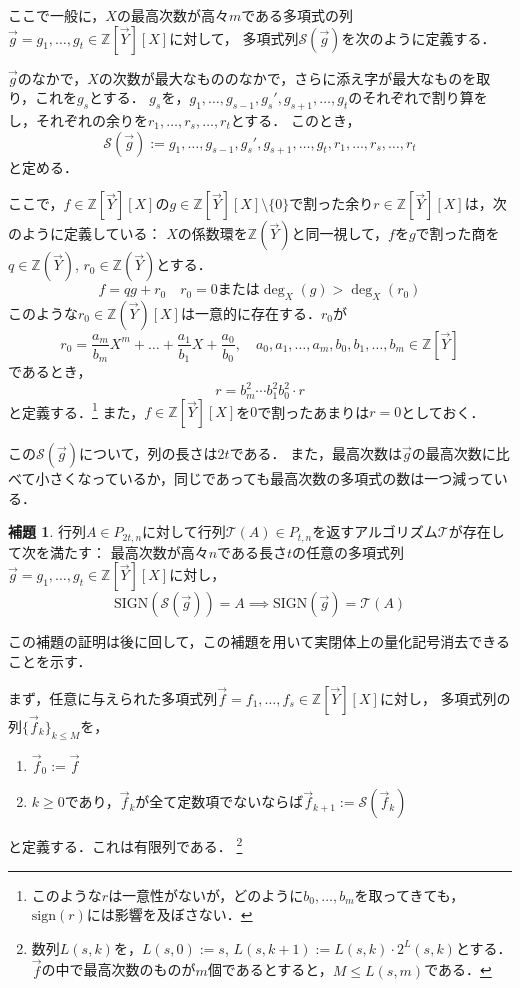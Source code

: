 \documentclass[uplatex, dvipdfmx]{jsarticle}
\newcommand{\sign}{\mathrm{sign}}
\newcommand{\SIGN}{\mathrm{SIGN}}
\newcommand{\Z}{\mathbb{Z}}
\theoremstyle{definition}
\newtheorem{lemma}{補題}[section]
\begin{document}
ここで一般に，$X$の最高次数が高々$m$である多項式の列
$\vec{g} = g_1, \dots, g_t \in \Z[\vec{Y}][X]$に対して，
多項式列$\mathcal{S}(\vec{g})$を次のように定義する．

$\vec{g}$のなかで，$X$の次数が最大なもののなかで，さらに添え字が最大なものを取り，これを$g_s$とする．
$g_s$を，$g_1, \dots, g_{s-1}, g_s', g_{s+1}, \dots, g_t$のそれぞれで割り算をし，それぞれの余りを$r_1, \dots, r_s, \dots, r_t$とする．
このとき，
\[
    \mathcal{S}(\vec{g}):= g_1, \dots, g_{s-1},g_s',g_{s+1},\dots, g_t, r_1, \dots, r_s, \dots, r_t
\]
と定める．


ここで，$f \in \Z[\vec{Y}][X]$の$g \in \Z[\vec{Y}][X] \setminus \{0\}$で割った余り$r \in \Z[\vec{Y}][X]$は，次のように定義している：
$X$の係数環を$\Z(\vec{Y})$と同一視して，$f$を$g$で割った商を$q \in \Z(\vec{Y})$, $r_0 \in \Z(\vec{Y})$とする．
\[ 
    f = q g + r_0 \quad \text{$r_0=0$または$\deg_X(g)>\deg_X(r_0)$}
\]
このような$r_0 \in \Z(\vec{Y})[X]$は一意的に存在する．$r_0$が
\[
    r_0 = \frac{a_m}{b_m} X^m + \dots +\frac{a_1}{b_1}X+ \frac{a_0}{b_0}, \quad a_0,a_1,\dots, a_m,b_0,b_1,\dots, b_m \in \Z[\vec{Y}]
\]
であるとき，
\[
    r = b_m^2 \cdots  b_1^2 b_0^2 \cdot r
\]
と定義する．\footnote{このような$r$は一意性がないが，どのように$b_0,\dots, b_m$を取ってきても，$\sign(r)$には影響を及ぼさない．}
また，$f \in \Z[\vec{Y}][X]$を$0$で割ったあまりは$r=0$としておく．


この$\mathcal{S}(\vec{g})$について，列の長さは$2t$である．
また，最高次数は$\vec{g}$の最高次数に比べて小さくなっているか，同じであっても最高次数の多項式の数は一つ減っている．

\begin{lemma} \label{main}
    行列$A \in P_{2t,n}$に対して行列$\mathcal{T}(A) \in P_{t,n}$を返すアルゴリズム$\mathcal{T}$が存在して次を満たす：
    最高次数が高々$n$である長さ$t$の任意の多項式列$\vec{g}=g_1, \dots, g_t \in \Z[\vec{Y}][X]$に対し，
    \[
        \SIGN(\mathcal{S}(\vec{g})) = A \implies \SIGN(\vec{g})=\mathcal{T}(A)
    \]
\end{lemma}
この補題の証明は後に回して，この補題を用いて実閉体上の量化記号消去できることを示す．

まず，任意に与えられた多項式列$\vec{f} = f_1, \dots, f_s \in \Z[\vec{Y}][X]$に対し，
多項式列の列$\{\vec{f}_k\}_{k\leq M}$を，
\begin{enumerate}
    \item $\vec{f}_0 := \vec{f}$
    \item $k \geq 0$であり，$\vec{f}_k$が全て定数項でないならば$\vec{f}_{k+1}:=\mathcal{S}(\vec{f}_k)$
\end{enumerate}
と定義する．これは有限列である．
\footnote{数列$L(s,k)$を，$L(s,0):=s$, $L(s,k+1):=L(s,k)\cdot 2^L(s,k)$とする．
    $\vec{f}$の中で最高次数のものが$m$個であるとすると，$M \leq L(s,m)$である．}
\end{document}
